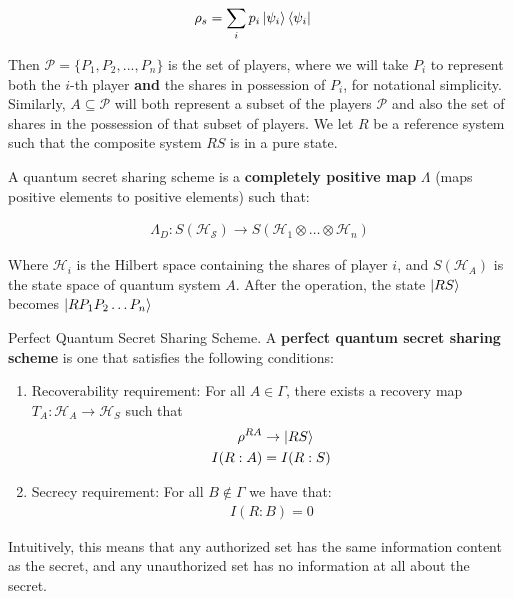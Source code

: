 \begin{align}
    \rho_s &= \sum_i p_i \ket{\psi_i} \bra{\psi_i}
\end{align}

Then $\mathcal{P} = \{P_1,P_2,...,P_n\}$ is the set of players, where we will take $P_i$ to represent both the $i$-th player \textbf{and} the shares in possession of $P_i$, for notational simplicity. Similarly, $A \subseteq \mathcal{P}$ will both represent a subset of the players $\mathcal{P}$ and also the set of shares in the possession of that subset of players. We let $R$ be a reference system such that the composite system $RS$ is in a pure state.

A quantum secret sharing scheme is a \textbf{completely positive map} $\Lambda$ (maps positive elements to positive elements) such that:

\begin{align}
    \Lambda_D: S(\mathcal{H_S}) \to S(\mathcal{H}_1 \otimes \dots \otimes \mathcal{H}_n)
\end{align}

Where $\mathcal{H}_i$ is the Hilbert space containing the shares of player $i$, and $S(\mathcal{H}_A)$ is the state space of quantum system $A$. After the operation, the state $\ket{RS}$ becomes $\ket{RP_1P_2 \dots P_n}$

\begin{definition}{Perfect Quantum Secret Sharing Scheme.}
    \label{defn:perfect-qss}
    A \textbf{perfect quantum secret sharing scheme} is one that satisfies the following conditions:

    \begin{enumerate}
        \item Recoverability requirement: For all $A \in \Gamma$, there exists a recovery map $T_A: \mathcal{H}_A \to \mathcal{H}_S$ such that 
        \begin{align} 
            \rho^{RA} &\to \ket{RS} \\
            I(R:A) &= I(R:S)
        \end{align}
        \item Secrecy requirement: For all $B \notin \Gamma$ we have that:
        \begin{align}
            I(R:B) = 0
        \end{align}
    \end{enumerate}

    Intuitively, this means that any authorized set has the same information content as the secret, and any unauthorized set has no information at all about the secret.
\end{definition}

